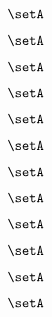 \begin{forslides}
    \begin{equation}
        \label{eq:parallelism-178}
        \setA
    \end{equation}

    \begin{equation}
        \label{eq:parallelism-179}
        \setA
    \end{equation}

    \begin{equation}
        \label{eq:parallelism-180}
        \setA
    \end{equation}

    \begin{equation}
        \label{eq:parallelism-181}
        \setA
    \end{equation}

    \begin{equation}
        \label{eq:parallelism-182}
        \setA
    \end{equation}

    \begin{equation}
        \label{eq:parallelism-183}
        \setA
    \end{equation}

    \begin{equation}
        \label{eq:parallelism-184}
        \setA
    \end{equation}

    \begin{equation}
        \label{eq:parallelism-185}
        \setA
    \end{equation}

    \begin{equation}
        \label{eq:parallelism-186}
        \setA
    \end{equation}

    \begin{equation}
        \label{eq:parallelism-187}
        \setA
    \end{equation}

    \begin{equation}
        \label{eq:parallelism-188}
        \setA
    \end{equation}

    \begin{equation}
        \label{eq:parallelism-189}
        \setA
    \end{equation}
    

\end{forslides}